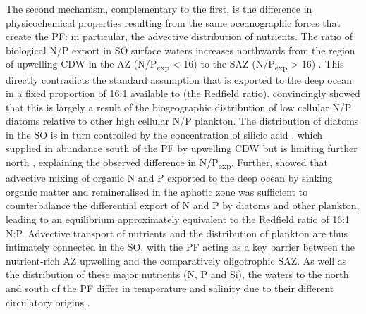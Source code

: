 The second mechanism, complementary to the first, is the difference in physicochemical properties resulting from the same oceanographic forces that create the \ac{PF}: in particular, the advective distribution of nutrients.
The ratio of biological N/P export in \ac{SO} surface waters increases northwards from the region of upwelling \ac{CDW} in the \ac{AZ} (N/P\textsubscript{exp} \textless{} 16) to the \ac{SAZ} (N/P\textsubscript{exp} \textgreater{} 16) \cite{Weber:2010fi}.
This directly contradicts the standard assumption that  is exported to the deep ocean in a fixed proportion of \textapprox{}16:1 available  to  (the Redfield ratio).
\citet{Weber:2010fi} convincingly showed that this is largely a result of the biogeographic distribution of low cellular N/P diatoms relative to other high cellular N/P plankton.
The distribution of diatoms in the \ac{SO} is in turn controlled by the concentration of silicic acid \cite{MFranck:2000kt}, which supplied in abundance south of the \ac{PF} by upwelling \ac{CDW} but is limiting further north \citep[widely held, but well summarised by][]{Coale:2004to}, explaining the observed difference in N/P\textsubscript{exp}.
Further, \citet{Weber:2010fi} showed that advective mixing of organic N and P exported to the deep ocean by sinking organic matter and remineralised in the aphotic zone was sufficient to counterbalance the differential export of N and P by diatoms and other plankton, leading to an equilibrium approximately equivalent to the Redfield ratio of 16:1 N:P.
Advective transport of nutrients and the distribution of plankton are thus intimately connected in the \ac{SO}, with the \ac{PF} acting as a key barrier between the nutrient-rich \ac{AZ} upwelling and the comparatively oligotrophic \ac{SAZ}.
As well as the distribution of these major nutrients (N, P and Si), the waters to the north and south of the \ac{PF} differ in temperature and salinity due to their different circulatory origins \cite{Foldvik:1988gp}.

